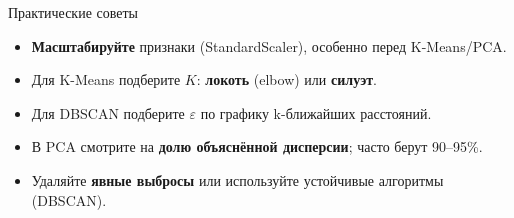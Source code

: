 \documentclass[aspectratio=169]{beamer}
\newcommand{\term}[1]{\textbf{#1}}
\begin{document}

\begin{frame}{Практические советы}
	\begin{itemize}
		\item \textbf{Масштабируйте} признаки (StandardScaler), особенно перед K-Means/PCA.
		\item Для K-Means подберите \(K\): \term{локоть} (elbow) или \term{силуэт}.
		\item Для DBSCAN подберите \(\varepsilon\) по графику k-ближайших расстояний.
		\item В PCA смотрите на \term{долю объяснённой дисперсии}; часто берут 90–95\%.
		\item Удаляйте \term{явные выбросы} или используйте устойчивые алгоритмы (DBSCAN).
	\end{itemize}
\end{frame}
\end{document}
